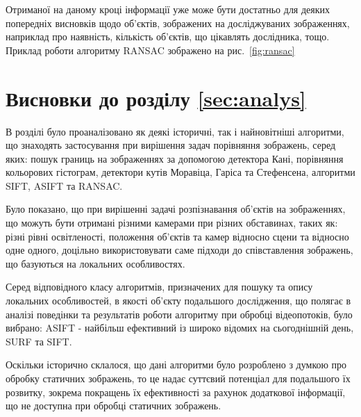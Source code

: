 
Отриманої на даному кроці інформації уже може бути достатньо для деяких попередніх висновків щодо об'єктів, зображених на досліджуваних зображеннях, наприклад про наявність, кількість об'єктів, що цікавлять дослідника, тощо. Приклад роботи алгоритму RANSAC зображено на рис.~\ref{fig:ransac}

\section{Висновки до розділу \ref{sec:analys}}

В розділі було проаналізовано як деякі історичні, так і найновітніші алгоритми, що знаходять застосування при вирішення задач порівняння зображень, серед яких: пошук границь на зображеннях за допомогою детектора Кані, порівняння кольорових гістограм, детектори кутів Моравіца, Гаріса та Стефенсена, алгоритми SIFT, ASIFT та RANSAC.

Було показано, що при вирішенні задачі розпізнавання об'єктів на зображеннях, що можуть бути отримані різними камерами при різних обставинах, таких як: різні рівні освітленості, положення об'єктів та камер відносно сцени та відносно одне одного, доцільно використовувати саме підходи до співставлення зображень, що базуються на локальних особливостях.

Серед відповідного класу алгоритмів, призначених для пошуку та опису локальних особливостей, в якості об'єкту подальшого дослідження, що полягає в аналізі поведінки та результатів роботи алгоритму при обробці відеопотоків, було вибрано: ASIFT - найбільш ефективний із широко відомих на сьогоднішній день, SURF та SIFT.

Оскільки історично склалося, що дані алгоритми було розроблено з думкою про обробку статичних зображень, то це надає суттєвий потенціал для подальшого їх розвитку, зокрема покращень їх ефективності за рахунок додаткової інформації, що не доступна при обробці статичних зображень.
